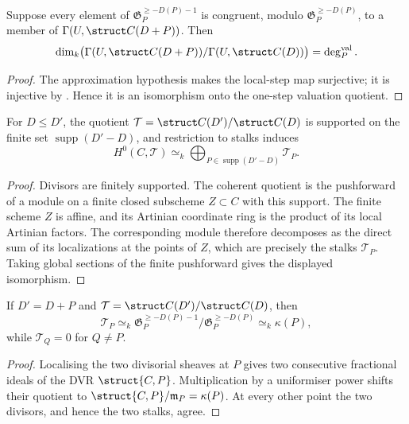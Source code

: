 \begin{theorem}
  \label{thm:adelic_local_step_dim_eq_residue_degree}
  \leanok
  Suppose every element of \(\mathfrak G_P^{\ge-D(P)-1}\) is congruent,
  modulo \(\mathfrak G_P^{\ge-D(P)}\), to a member of
  \(\Gamma(U,\struct C(D+P))\).  Then
  \[
    \dim_k\bigl(\Gamma(U,\struct C(D+P))/\Gamma(U,\struct C(D))\bigr)
      =\deg_P^{\mathrm{val}}.
  \]
\end{theorem}
\begin{proof}
  \leanok
  The approximation hypothesis makes the local-step map surjective; it is
  injective by .  Hence it is an
  isomorphism onto the one-step valuation quotient.
\end{proof}

\begin{proposition}
  \label{thm:adelic_finite_support_quotient_sections}
  \notready
  For \(D\le D'\), the quotient
  \(\mathcal T=\struct C(D')/\struct C(D)\) is supported on the finite set
  \(\operatorname{supp}(D'-D)\), and restriction to stalks induces
  \[
    H^0(C,\mathcal T)\simeq_k
      \bigoplus_{P\in\operatorname{supp}(D'-D)}\mathcal T_P.
  \]
\end{proposition}
\begin{proof}
  Divisors are finitely supported.  The coherent quotient is the pushforward
  of a module on a finite closed subscheme \(Z\subset C\) with this support.
  The finite scheme \(Z\) is affine, and its Artinian coordinate ring is the
  product of its local Artinian factors.  The corresponding module therefore
  decomposes as the direct sum of its localizations at the points of \(Z\),
  which are precisely the stalks \(\mathcal T_P\).  Taking global sections of
  the finite pushforward gives the displayed isomorphism.
\end{proof}

\begin{proposition}
  \label{thm:adelic_twist_stalk_quotient}
  \notready
  If \(D'=D+P\) and
  \(\mathcal T=\struct C(D')/\struct C(D)\), then
  \[
    \mathcal T_P\simeq_k
      \mathfrak G_P^{\ge-D(P)-1}/\mathfrak G_P^{\ge-D(P)}
      \simeq_k\kappa(P),
  \]
  while \(\mathcal T_Q=0\) for \(Q\ne P\).
\end{proposition}
\begin{proof}
  Localising the two divisorial sheaves at \(P\) gives two consecutive
  fractional ideals of the DVR \(\struct{C,P}\).  Multiplication by a
  uniformiser power shifts their quotient to
  \(\struct{C,P}/\mathfrak m_P=\kappa(P)\).  At every other point the two
  divisors, and hence the two stalks, agree.
\end{proof}

